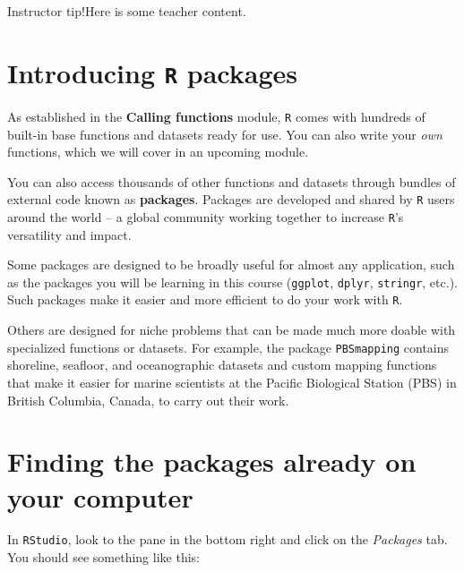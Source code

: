 \documentclass[
]{book}
\begin{document}
Instructor tip!Here is some teacher content.

\hypertarget{introducing-r-packages}{%
\section*{\texorpdfstring{Introducing \texttt{R} packages}{Introducing R packages}}\label{introducing-r-packages}}

As established in the \textbf{Calling functions} module, \texttt{R} comes with hundreds of built-in base functions and datasets ready for use. You can also write your \emph{own} functions, which we will cover in an upcoming module.

You can also access thousands of other functions and datasets through bundles of external code known as \textbf{packages}. Packages are developed and shared by \texttt{R} users around the world -- a global community working together to increase \texttt{R}'s versatility and impact.

Some packages are designed to be broadly useful for almost any application, such as the packages you will be learning in this course (\texttt{ggplot}, \texttt{dplyr}, \texttt{stringr}, etc.). Such packages make it easier and more efficient to do your work with \texttt{R}.

Others are designed for niche problems that can be made much more doable with specialized functions or datasets. For example, the package \texttt{PBSmapping} contains shoreline, seafloor, and oceanographic datasets and custom mapping functions that make it easier for marine scientists at the Pacific Biological Station (PBS) in British Columbia, Canada, to carry out their work.

\hypertarget{finding-the-packages-already-on-your-computer}{%
\section*{Finding the packages already on your computer}\label{finding-the-packages-already-on-your-computer}}

In \texttt{RStudio}, look to the pane in the bottom right and click on the \emph{Packages} tab. You should see something like this:
\end{document}
